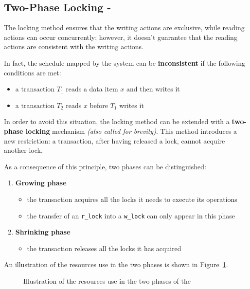 \documentclass[english]{article}
\begin{document}
\subsection{Two-Phase Locking - \TPL}

The locking method ensures that the writing actions are exclusive, while reading actions can occur concurrently;
however, it doesn't guarantee that the reading actions are consistent with the writing actions.

In fact, the schedule mapped by the \CC system can be \textbf{inconsistent} if the following conditions are met:

\begin{itemize}
  \item a transaction \(T_1\) reads a data item \(x\) and then writes it
  \item a transaction \(T_2\) reads \(x\) before \(T_1\) writes it
\end{itemize}

In order to avoid this situation, the locking method can be extended with a \textbf{two-phase locking} mechanism \textit{(also called
  \TPL for brevity)}.
This method introduces a new restriction: a transaction, after having released a lock, cannot acquire another lock.

As a consequence of this principle, two phases can be distinguished:

\begin{enumerate}
  \item \textbf{Growing phase}
        \begin{itemize}
          \item the transaction acquires all the locks it needs to execute its operations
          \item the transfer of an \texttt{r\_lock} into a \texttt{w\_lock} can only appear in this phase
        \end{itemize}
  \item \textbf{Shrinking phase}
        \begin{itemize}
          \item the transaction releases all the locks it has acquired
        \end{itemize}
\end{enumerate}

An illustration of the resources use in the two phases is shown in Figure~\ref{fig:resources-use-phases-two-phases-locking}.

\begin{figure}[htbp]
  \centering
  \bigskip
  \caption{Illustration of the resources use in the two phases of the \TPL}
  \label{fig:resources-use-phases-two-phases-locking}
  \bigskip
\end{figure}
\end{document}
